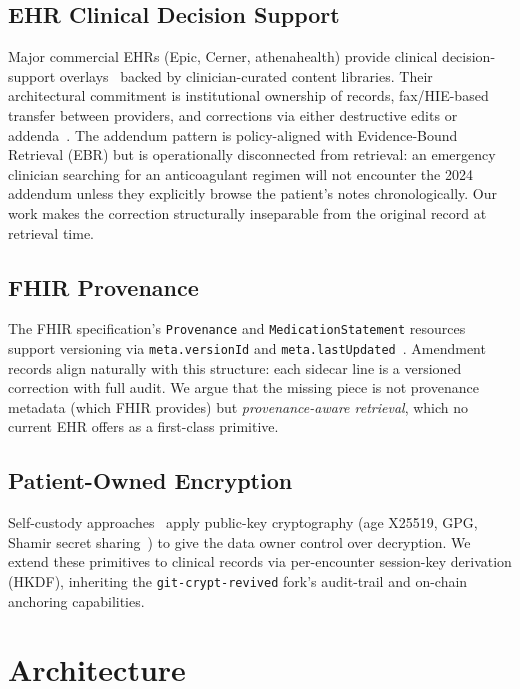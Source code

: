 \documentclass[runningheads]{llncs}
\begin{document}
\subsection{EHR Clinical Decision Support}

Major commercial EHRs (Epic, Cerner, athenahealth) provide clinical
decision-support overlays~\cite{epicCDS,cernerCDS} backed by clinician-curated
content libraries. Their architectural commitment is institutional ownership
of records, fax/HIE-based transfer between providers, and corrections via
either destructive edits or addenda~\cite{addendum2018}. The addendum
pattern is policy-aligned with Evidence-Bound Retrieval (EBR) but is operationally
disconnected from retrieval: an emergency clinician searching for an
anticoagulant regimen will not encounter the 2024 addendum unless they
explicitly browse the patient's notes chronologically. Our work makes the
correction structurally inseparable from the original record at retrieval time.

\subsection{FHIR Provenance}

The FHIR
specification's \texttt{Provenance} and \texttt{MedicationStatement} resources
support versioning via \texttt{meta.versionId} and
\texttt{meta.lastUpdated}~\cite{fhir2023}. Amendment records align
naturally with this structure: each sidecar line is a versioned correction
with full audit. We argue that the missing piece is not provenance metadata
(which FHIR provides) but \emph{provenance-aware retrieval}, which no current
EHR offers as a first-class primitive.

\subsection{Patient-Owned Encryption}

Self-custody approaches~\cite{age2023, gitcrypt2021} apply public-key
cryptography (age X25519, GPG, Shamir secret sharing~\cite{shamir1979}) to
give the data owner control over decryption. We extend these primitives to
clinical records via per-encounter session-key derivation (HKDF), inheriting
the \texttt{git-crypt-revived} fork's audit-trail and on-chain anchoring
capabilities.

\section{Architecture}
\label{sec:architecture}
\end{document}

